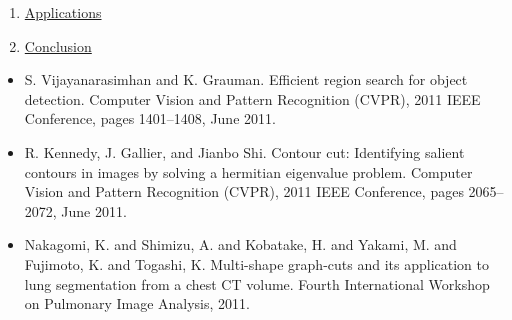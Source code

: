 \documentclass[11pt, a4paper, landscape]{article}
\begin{document}
\begin{enumerate}
\item \hyperlink{sli:application}{Applications}
\item \hyperlink{sli:conclusion}{Conclusion}
\end{enumerate}
\vfill


\NewPage{} 
\vfill 
\begin{itemize}
\item S. Vijayanarasimhan and K. Grauman. \alert{Efficient region search for object detection.} Computer Vision and Pattern Recognition (CVPR), 2011 IEEE Conference, pages 1401--1408, June 2011.
\item R. Kennedy, J. Gallier, and Jianbo Shi. \alert{Contour cut: Identifying salient contours in images
by solving a hermitian eigenvalue problem.} Computer Vision and Pattern Recognition (CVPR), 2011 IEEE Conference, pages 2065--2072, June 2011.
\item Nakagomi, K. and Shimizu, A. and Kobatake, H. and Yakami, M. and Fujimoto, K. and Togashi, K. \alert{Multi-shape graph-cuts and its application to lung segmentation from a chest CT volume.} Fourth International Workshop on Pulmonary Image Analysis, 2011.
\end{itemize}
\nocite{*}
\vfill
\end{document}

